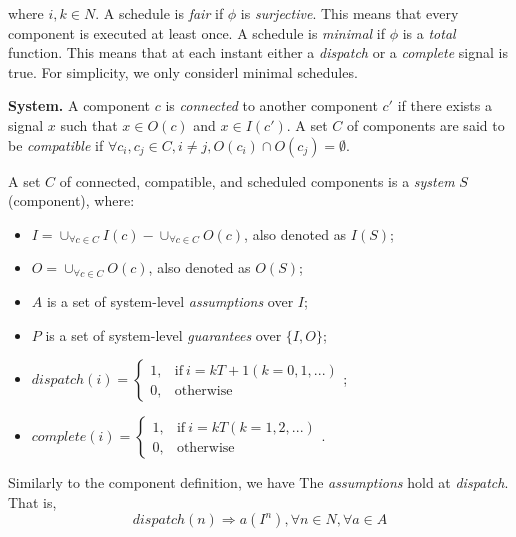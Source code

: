where $i,k\in N$. 
A schedule is \emph{fair} if $\phi$ is \emph{surjective}. This means that every component is executed at least once.
A schedule is \emph{minimal} if $\phi$ is a \emph{total} function. This means that at each instant either a \emph{dispatch} or a \emph{complete} signal is true. 
For simplicity, we only considerl minimal schedules.

{\bf System.}
A component $c$ is \emph{connected} to another component $c'$ if there exists a signal $x$ such that $x \in O(c)$ and $x \in I(c')$. 
A set $C$ of components are said to be \emph{compatible} if 
$\forall c_i,c_j \in C, i\neq j, O(c_i) \cap O(c_j) = \emptyset$.

A set $C$ of connected, compatible, and scheduled components is a \emph{system} $S$ (component), where:
\begin{itemize}
	\item $I = \cup_{\forall c \in C}I(c) -  \cup_{\forall c \in C}O(c)$, also denoted as $I(S)$;
	\item $O = \cup_{\forall c \in C}O(c)$, also denoted as $O(S)$;
	\item $A$ is a set of system-level \emph{assumptions} over $I$;
	\item $P$ is a set of system-level \emph{guarantees} over $\{I, O\}$;
	\item $dispatch (i) = 
	    	\begin{cases}
      		1, & \text{if}\ i = kT+1 (k=0,1,...)\\
	     	0, & \text{otherwise}
   	 	\end{cases}$;
   	\item $complete (i) =
   		\begin{cases}
      		1, & \text{if}\ i = kT (k=1,2,...)\\
	     	0, & \text{otherwise}
   	 	\end{cases}$.
\end{itemize}

Similarly to the component definition, we have
The \emph{assumptions} hold at \emph{dispatch}. That is,
\begin{equation} 
\label{eqn:assumption}
dispatch(n) \Rightarrow a(I^n), \forall n\in N, \forall a \in A
\end{equation}

